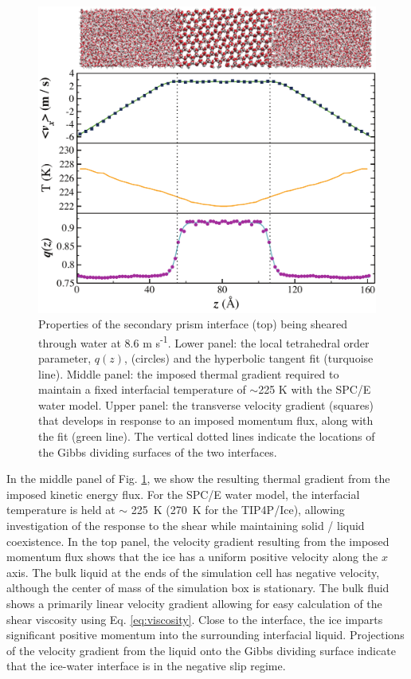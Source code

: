 \begin{figure}
\includegraphics[width=\linewidth]{Figures/SecPrismComicStrip}
\caption{\label{fig:spComic} Properties of the secondary prism
  interface (top) being sheared through water at 8.6 m
  s\textsuperscript{-1}. Lower panel: the local tetrahedral order
  parameter, $q(z)$, (circles) and the hyperbolic tangent fit
  (turquoise line).  Middle panel: the imposed thermal gradient
  required to maintain a fixed interfacial temperature of $\sim$225 K
  with the SPC/E water model. Upper panel: the transverse velocity
  gradient (squares) that develops in response to an imposed momentum
  flux, along with the fit (green line). The vertical dotted lines
  indicate the locations of the Gibbs dividing surfaces of the two
  interfaces.}
\end{figure}

In the middle panel of Fig. \ref{fig:spComic}, we show the resulting
thermal gradient from the imposed kinetic energy flux. For the SPC/E
water model, the interfacial temperature is held at $\sim$ 225~K
(270~K for the TIP4P/Ice), allowing investigation of the response to
the shear while maintaining solid / liquid coexistence. In the top
panel, the velocity gradient resulting from the imposed momentum flux
shows that the ice has a uniform positive velocity along the $x$
axis. The bulk liquid at the ends of the simulation cell has negative
velocity, although the center of mass of the simulation box is
stationary.  The bulk fluid shows a primarily linear velocity gradient
allowing for easy calculation of the shear viscosity using
Eq. \eqref{eq:viscosity}. Close to the interface, the ice imparts
significant positive momentum into the surrounding interfacial liquid.
Projections of the velocity gradient from the liquid onto the Gibbs
dividing surface indicate that the ice-water interface is in the
negative slip regime.

